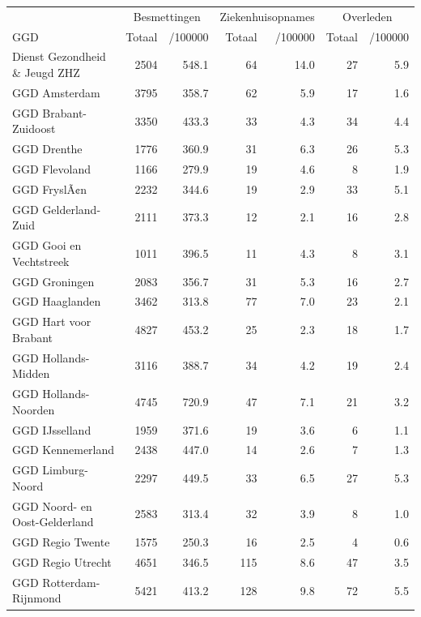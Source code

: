\documentclass[
  english,
  man,floatsintext]{apa6}
\begin{document}
\begin{table}
\centering\begingroup\fontsize{10}{12}\selectfont

\begin{threeparttable}
\begin{tabular}{lrrrrrr}
\toprule
\multicolumn{1}{c}{ } & \multicolumn{2}{c}{Besmettingen} & \multicolumn{2}{c}{Ziekenhuisopnames} & \multicolumn{2}{c}{Overleden} \\
\cmidrule(l{3pt}r{3pt}){2-3} \cmidrule(l{3pt}r{3pt}){4-5} \cmidrule(l{3pt}r{3pt}){6-7}
GGD & Totaal & /100000 & Totaal & /100000 & Totaal & /100000\\
\midrule
Dienst Gezondheid \& Jeugd ZHZ & 2504 & 548.1 & 64 & 14.0 & 27 & 5.9\\
GGD Amsterdam & 3795 & 358.7 & 62 & 5.9 & 17 & 1.6\\
GGD Brabant-Zuidoost & 3350 & 433.3 & 33 & 4.3 & 34 & 4.4\\
GGD Drenthe & 1776 & 360.9 & 31 & 6.3 & 26 & 5.3\\
GGD Flevoland & 1166 & 279.9 & 19 & 4.6 & 8 & 1.9\\
GGD FryslÃ¢n & 2232 & 344.6 & 19 & 2.9 & 33 & 5.1\\
GGD Gelderland-Zuid & 2111 & 373.3 & 12 & 2.1 & 16 & 2.8\\
GGD Gooi en Vechtstreek & 1011 & 396.5 & 11 & 4.3 & 8 & 3.1\\
GGD Groningen & 2083 & 356.7 & 31 & 5.3 & 16 & 2.7\\
GGD Haaglanden & 3462 & 313.8 & 77 & 7.0 & 23 & 2.1\\
GGD Hart voor Brabant & 4827 & 453.2 & 25 & 2.3 & 18 & 1.7\\
GGD Hollands-Midden & 3116 & 388.7 & 34 & 4.2 & 19 & 2.4\\
GGD Hollands-Noorden & 4745 & 720.9 & 47 & 7.1 & 21 & 3.2\\
GGD IJsselland & 1959 & 371.6 & 19 & 3.6 & 6 & 1.1\\
GGD Kennemerland & 2438 & 447.0 & 14 & 2.6 & 7 & 1.3\\
GGD Limburg-Noord & 2297 & 449.5 & 33 & 6.5 & 27 & 5.3\\
GGD Noord- en Oost-Gelderland & 2583 & 313.4 & 32 & 3.9 & 8 & 1.0\\
GGD Regio Twente & 1575 & 250.3 & 16 & 2.5 & 4 & 0.6\\
GGD Regio Utrecht & 4651 & 346.5 & 115 & 8.6 & 47 & 3.5\\
GGD Rotterdam-Rijnmond & 5421 & 413.2 & 128 & 9.8 & 72 & 5.5\\

\end{tabular}
\end{threeparttable}
\end{table}
\end{document}
